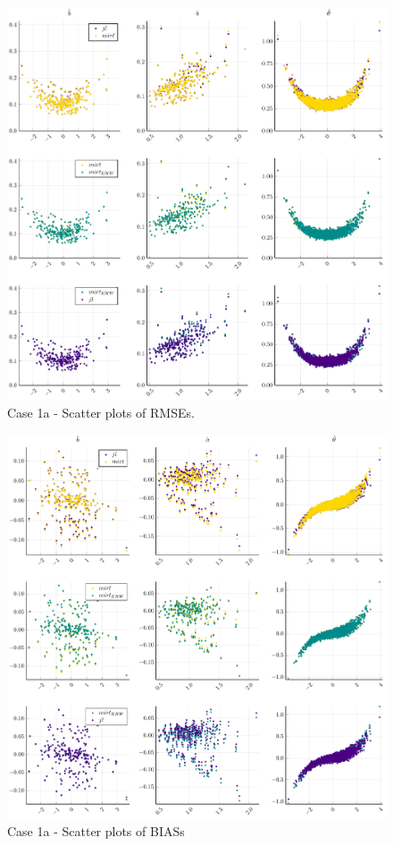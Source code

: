 \begin{figure}[h]
	\centering
	\includegraphics[width=\textwidth]{Figures/1/RMSEscatter.pdf}
	\caption{Case 1a - Scatter plots of RMSEs.}
	\label{fig:spRMSE1a}
\end{figure}
\begin{figure}[h]
	\centering
	\includegraphics[width=\textwidth]{Figures/1/BIASscatter.pdf}
	\caption{Case 1a - Scatter plots of BIASs }
	\label{fig:spBIAS1a}
\end{figure}
